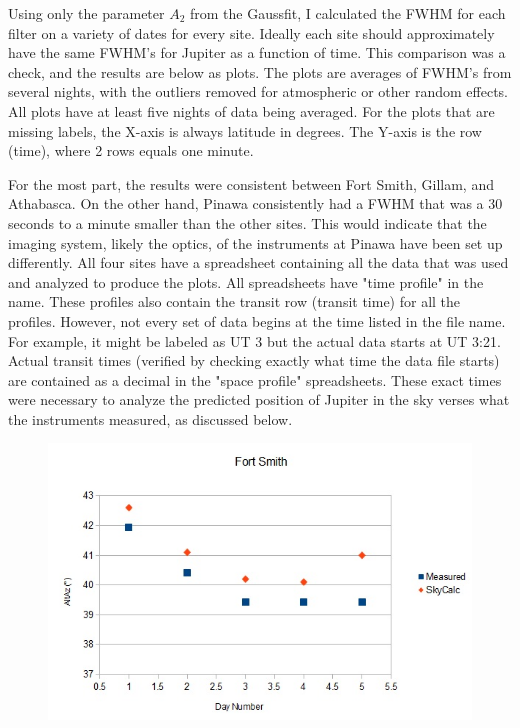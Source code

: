 \documentclass[11pt]{article}
\begin{document}
\hspace{0.5cm}
Using only the parameter $A_2$ from the Gaussfit, I calculated the FWHM for each filter on a variety of dates for every site.  Ideally each site should approximately have the same FWHM's for Jupiter as a function of time. This comparison was a check, and the results are below as plots. The plots are averages of FWHM's from several nights, with the outliers removed for atmospheric or other random effects. All plots  have at least five nights of data being averaged. For the plots that are missing labels, the X-axis is always latitude in degrees. The Y-axis is the row (time), where 2 rows equals one minute.

\hspace{0.5cm}

For the most part, the results were consistent between Fort Smith, Gillam, and Athabasca. On the other hand, Pinawa consistently had a FWHM that was a 30 seconds to a minute smaller than the other sites. This would indicate that the imaging system, likely the optics, of the instruments at Pinawa have been set up differently. All four sites have a spreadsheet containing all the data that was used and analyzed to produce the plots. All spreadsheets have "time profile" in the name. These profiles also contain the transit row (transit time) for all the profiles. However, not every set of data begins at the time listed in the file name. For example, it might be labeled as UT 3 but the actual data starts at UT 3:21. Actual transit times (verified by checking exactly what time the data file starts) are contained as a decimal in the "space profile" spreadsheets. These exact times were necessary to analyze the predicted position of Jupiter in the sky verses what the instruments measured, as discussed below.



\begin{figure}[h!]
\includegraphics[scale=1.0]{fortsmith_AltAz_comparison.jpg}
\end{figure}
\end{document}
